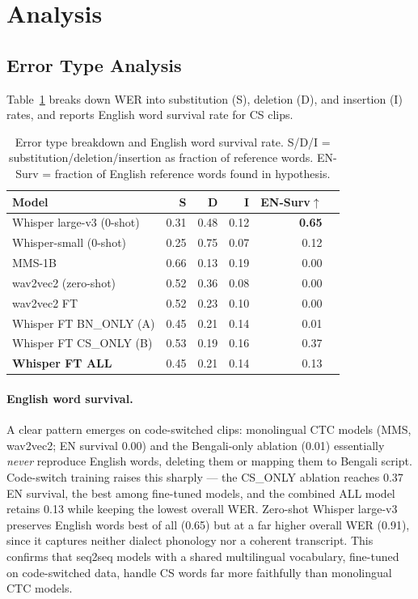 \section{Analysis}
\label{sec:analysis}

\subsection{Error Type Analysis}

Table~\ref{tab:error_types} breaks down WER into substitution (S), deletion
(D), and insertion (I) rates, and reports English word survival rate for CS
clips.

\begin{table}[h]
\centering
\caption{Error type breakdown and English word survival rate.
S/D/I = substitution/deletion/insertion as fraction of reference words.
EN-Surv = fraction of English reference words found in hypothesis.}
\label{tab:error_types}
\small
\begin{tabular}{lrrrrr}
\toprule
\textbf{Model} & \textbf{S} & \textbf{D} & \textbf{I} & \textbf{EN-Surv}$\uparrow$ \\
\midrule
Whisper large-v3 (0-shot) & 0.31 & 0.48 & 0.12 & \textbf{0.65} \\
Whisper-small (0-shot)    & 0.25 & 0.75 & 0.07 & 0.12 \\
MMS-1B                    & 0.66 & 0.13 & 0.19 & 0.00 \\
wav2vec2 (zero-shot)      & 0.52 & 0.36 & 0.08 & 0.00 \\
\midrule
wav2vec2 FT               & 0.52 & 0.23 & 0.10 & 0.00 \\
\midrule
Whisper FT BN\_ONLY (A)   & 0.45 & 0.21 & 0.14 & 0.01 \\
Whisper FT CS\_ONLY (B)   & 0.53 & 0.19 & 0.16 & 0.37 \\
\textbf{Whisper FT ALL}   & 0.45 & 0.21 & 0.14 & 0.13 \\
\bottomrule
\end{tabular}
\end{table}

\paragraph{English word survival.}
A clear pattern emerges on code-switched clips: monolingual CTC models (MMS,
wav2vec2; EN survival 0.00) and the Bengali-only ablation (0.01) essentially
\emph{never} reproduce English words, deleting them or mapping them to Bengali
script. Code-switch training raises this sharply --- the CS\_ONLY ablation
reaches 0.37 EN survival, the best among fine-tuned models, and the combined
ALL model retains 0.13 while keeping the lowest overall WER. Zero-shot Whisper
large-v3 preserves English words best of all (0.65) but at a far higher overall
WER (0.91), since it captures neither dialect phonology nor a coherent
transcript. This
confirms that seq2seq models with a shared multilingual vocabulary, fine-tuned
on code-switched data, handle CS words far more faithfully than monolingual
CTC models.

